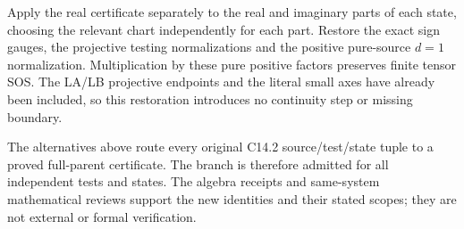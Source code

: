 Apply the real certificate separately to the real and imaginary
parts of each state, choosing the relevant chart independently for
each part.  Restore the exact sign gauges, the projective testing
normalizations and the positive pure-source $d=1$ normalization.
Multiplication by these pure positive factors preserves finite
tensor SOS.  The LA/LB projective endpoints and the literal small
axes have already been included, so this restoration introduces
no continuity step or missing boundary.

The alternatives above route every original C14.2 source/test/state
tuple to a proved full-parent certificate.  The branch is therefore
admitted for all independent tests and states.  The algebra receipts
and same-system mathematical reviews support the new identities
and their stated scopes; they are not external or formal verification.
